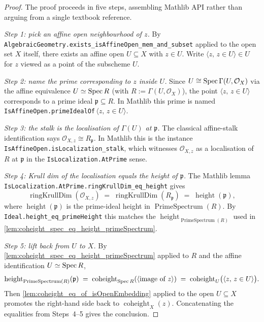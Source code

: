 \begin{proof}
  
  \leanok
  The proof proceeds in five steps, assembling Mathlib API rather than
  arguing from a single textbook reference.

  \emph{Step 1: pick an affine open neighbourhood of \(z\).} By
  \texttt{AlgebraicGeometry.exists\_isAffineOpen\_mem\_and\_subset}
  applied to the open set \(X\) itself, there exists an affine open
  \(U \subseteq X\) with \(z \in U\). Write \(\langle z, \, z \in U \rangle \in U\)
  for \(z\) viewed as a point of the subscheme \(U\).

  \emph{Step 2: name the prime corresponding to \(z\) inside \(U\).} Since
  \(U \cong \operatorname{Spec} \Gamma(U, \mathcal{O}_X)\) via the affine equivalence
  \(U \simeq \operatorname{Spec} R\) (with \(R := \Gamma(U, \mathcal{O}_X)\)), the point
  \(\langle z, \, z \in U\rangle\) corresponds to a prime ideal \(\mathfrak{p}
  \subseteq R\). In Mathlib this prime is named
  \texttt{IsAffineOpen.primeIdealOf}\,\(\langle z, \, z \in U\rangle\).

  \emph{Step 3: the stalk is the localisation of \(\Gamma(U)\) at
  \(\mathfrak{p}\).} The classical affine-stalk identification says
  \(\mathcal{O}_{X,z} \cong R_{\mathfrak{p}}\). In Mathlib this is the
  instance \texttt{IsAffineOpen.isLocalization\_stalk}, which witnesses
  \(\mathcal{O}_{X,z}\) as a localisation of \(R\) at \(\mathfrak{p}\) in the
  \texttt{IsLocalization.AtPrime} sense.

  \emph{Step 4: Krull dim of the localisation equals the height of
  \(\mathfrak{p}\).} The Mathlib lemma
  \texttt{IsLocalization.AtPrime.ringKrullDim\_eq\_height} gives
  \[
    \operatorname{ringKrullDim}(\mathcal{O}_{X,z}) \;=\;
    \operatorname{ringKrullDim}(R_{\mathfrak{p}}) \;=\;
    \operatorname{height}(\mathfrak{p}),
  \]
  where \(\operatorname{height}(\mathfrak{p})\) is the prime-ideal height in
  \(\operatorname{PrimeSpectrum}(R)\). By
  \texttt{Ideal.height\_eq\_primeHeight} this matches the
  \(\operatorname{height}_{\operatorname{PrimeSpectrum}(R)}\) used in
  \cref{lem:coheight_spec_eq_height_primeSpectrum}.

  \emph{Step 5: lift back from \(U\) to \(X\).} By
  \cref{lem:coheight_spec_eq_height_primeSpectrum} applied to \(R\) and the
  affine identification \(U \simeq \operatorname{Spec} R\),
  \[
    \operatorname{height}_{\operatorname{PrimeSpectrum}(R)}(\mathfrak{p}) \;=\;
    \operatorname{coheight}_{\operatorname{Spec} R}(\langle\text{image of } z\rangle) \;=\;
    \operatorname{coheight}_{U}\bigl(\langle z, \, z \in U\rangle\bigr).
  \]
  Then \cref{lem:coheight_eq_of_isOpenEmbedding} applied to the open
  \(U \subseteq X\) promotes the right-hand side back to
  \(\operatorname{coheight}_{X}(z)\). Concatenating the equalities from
  Steps~4--5 gives the conclusion.
\end{proof}

